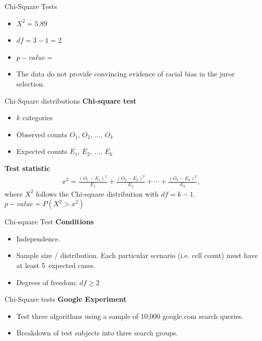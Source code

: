 \documentclass[12pt,a4paper]{beamer}
\begin{document}
		\begin{frame}{Chi-Square Tests}
			\begin{itemize}
			\item $X^2=5.89$
			\item $df=3-1=2$
			\item $p-value=$
			\item The data do not provide convincing evidence of racial bias in the juror selection.
		\end{itemize}
		\end{frame}
		\begin{frame}{Chi-Square distributions}
			\textbf{Chi-square test}
			\begin{itemize}
				\item $k$ categories
				\item Observed counts $O_1$, $O_2$, ..., $O_k$
				\item Expected counts $E_1$, $E_2$, ..., $E_k$
				\end{itemize} 
				\textbf{Test statistic}
			\begin{align*}
			x^2 = \frac{(O_1 - E_1)^2}{E_1} + \frac{(O_2 - E_2)^2}{E_2} + \cdots + \frac{(O_k - E_k)^2}{E_k},
			\end{align*}
			where $X^2$ follows the Chi-square distribution with $df=k-1.$
			\vspace{0.3cm}
			$p-value=P(X^2>x^2)$
		\end{frame}
		\begin{frame}{Chi-square Test}
			\textbf{Conditions}
			\begin{itemize}
			\item Independence.
			\item Sample size / distribution. Each particular scenario (i.e. cell count) must have at least 5~expected cases.
			\item Degrees of freedom: $df\geq 2$
		\end{itemize}
		\end{frame}
			\begin{frame}{Chi-Square tests}
				\textbf{Google Experiment}\\
				\begin{itemize}
					\item Test three algorithms using a sample of 10,000 google.com search queries.
				\item Breakdown of test subjects into three search groups.
			\end{itemize}
				\begin{table}[h]
				\centering
				\end{table}
			\end{frame}
\end{document}
